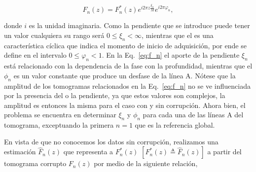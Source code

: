 
\begin{equation}
\label{eq:f_n}
F_n(z) = F_n^{\ast}(z)e^{i2\pi z\frac{\xi_n}{M}}e^{i2\pi \varphi_n},
\end{equation}

\noindent donde $i$ es la unidad imaginaria. Como la pendiente que se introduce puede tener un valor cualquiera su rango será $0\leq\xi_n<\infty$, mientras que el \offset es una característica cíclica que indica el momento de inicio de adquisición, por ende se define en el intervalo $0\leq\varphi_n<1$. En la Eq.~\ref{eq:f_n} el aporte de la pendiente $\xi_n$ está relacionado con la dependencia de la fase con la profundidad, mientras que el \offset $\phi_n$ es un valor constante que produce un desfase de la línea A. Nótese que la amplitud de los tomogramas relacionados en la Eq.~\ref{eq:f_n} no se ve influenciada por la presencia del \offset o la pendiente, ya que estos valores son complejos, la amplitud es entonces la misma para el caso con y sin corrupción. Ahora bien, el problema se encuentra en determinar $\xi_n$ y $\phi_n$ para cada una de las líneas A del tomograma, exceptuando la primera $n=1$ que es la referencia global.

En vista de que no conocemos los datos sin corrupción, realizamos una estimación $\hat{F}_n(z)$ que representa a $F^{\ast}_n(z)$ $\left[F^{\ast}_n(z) \triangleq \hat{F}_n(z)\right]$ a partir del tomograma corrupto $F_n(z)$ por medio de la siguiente relación,



